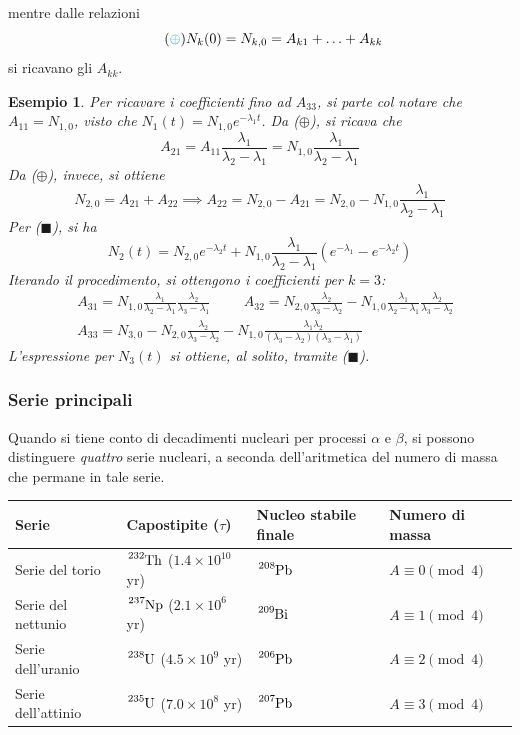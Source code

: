\documentclass[11pt, a4paper]{scrartcl}
\theoremstyle{style}
\newtheorem{esempio}{Esempio}[section]
\numberwithin{equation}{subsection}
\begin{document}
mentre dalle relazioni 
\begin{equation}
	\tag{{\color{cyan}$\oplus$}}
	N_k(0) = N_{k,0} = A_{k 1} + \ldots + A_{k k }
\end{equation}
si ricavano gli $A_{ k k}$.
\begin{esempio}
Per ricavare i coefficienti fino ad $A_{33}$, si parte col notare che $A_{11} = N_{1,0}$, visto che $N_1(t) = N_{1,0} e^{-\lambda _1 t}$.
Da ({\color{orange}$\oplus$}), si ricava che 
\[
A_{21} = A_{11} \frac{\lambda _1}{\lambda _2 - \lambda _1} = N_{1,0} \frac{\lambda _1}{ \lambda _2 - \lambda _1}
\] 
Da ({\color{cyan}$\oplus$}), invece, si ottiene 
\[
N_{2,0} = A_{21} + A_{22} \implies A_{22} = N_{2,0} - A_{21} = N_{2,0} - N_{1,0} \frac{\lambda _1}{\lambda _2 - \lambda _1}
\] 
Per ({\color{violet}$\blacksquare$}), si ha
\begin{equation}
	N_2(t) = N_{2,0} e^{-\lambda _2 t} + N_{1,0} \frac{\lambda _1}{\lambda _2 - \lambda _1} \left(e^{-\lambda _1} - e^{-\lambda _2 t}\right) 
\end{equation}
Iterando il procedimento, si ottengono i coefficienti per $k=3$:
\[
\begin{split}
	&A_{31} = N_{1,0} \frac{\lambda _1}{\lambda _2 - \lambda _1} \frac{\lambda _2}{\lambda _3 - \lambda _1} \hspace{1cm} A_{32} = N_{2,0} \frac{\lambda _2}{\lambda _3 - \lambda _2} - N_{1,0} \frac{\lambda _1}{\lambda _2- \lambda _1} \frac{\lambda _2}{\lambda _3 - \lambda _2} \\
	&A_{33} = N_{3,0} - N_{2,0} \frac{\lambda _2}{\lambda _3 - \lambda _2 } - N_{1,0} \frac{\lambda _1\lambda _2}{ (\lambda _3 - \lambda _2)(\lambda _3 - \lambda _1)}
\end{split}
\] 
L'espressione per $N_3(t)$ si ottiene, al solito, tramite ({\color{violet}$\blacksquare$}).
\end{esempio}
\subsubsection{Serie principali}

Quando si tiene conto di decadimenti nucleari per processi $\alpha $ e $\beta $, si possono distinguere \textit{quattro} serie nucleari, a seconda dell'aritmetica del numero di massa che permane in tale serie. 
\begin{table}[h!]
	\centering
	\begin{tabular}{l l l l}
	Serie & Capostipite ($\tau $) & Nucleo stabile finale & Numero di massa \\
	\hline
	Serie del torio & $\ce{^{232}Th}$ ($1.4\times 10^{10}$ yr) & $\ce{^{208}Pb}$ & $A\equiv 0 \pmod{4}$\\
	Serie del nettunio & $\ce{^{237}Np}$ ($2.1\times 10^{6}$ yr) & $\ce{^{209}Bi}$& $A\equiv 1 \pmod{4} $\\
	Serie dell'uranio & $\ce{^{238}U}$ ($4.5\times 10^{9}$ yr) & $\ce{^{206}Pb}$ & $A\equiv 2 \pmod{4} $\\
	Serie dell'attinio & $\ce{^{235}U}$ ($7.0 \times 10^{8}$ yr)& $\ce{^{207}Pb}$ & $A\equiv 3 \pmod{4} $\\
	\end{tabular}
\end{table}
\end{document}
